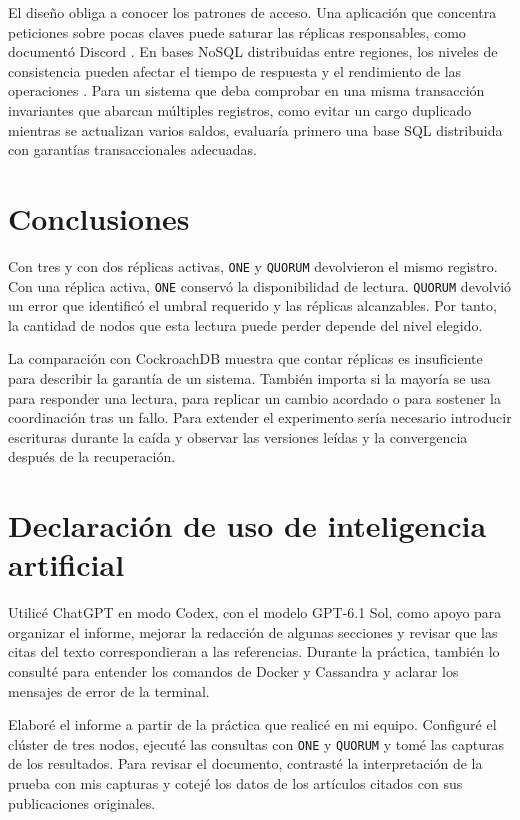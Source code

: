 \documentclass[12pt,a4paper]{article}
\begin{document}
El diseño obliga a conocer los patrones de acceso. Una aplicación que concentra peticiones sobre pocas claves puede saturar las réplicas responsables, como documentó Discord \cite{discord2023}. En bases NoSQL distribuidas entre regiones, los niveles de consistencia pueden afectar el tiempo de respuesta y el rendimiento de las operaciones \cite{ferreira2024,ferreira_benchmarking_2025}. Para un sistema que deba comprobar en una misma transacción invariantes que abarcan múltiples registros, como evitar un cargo duplicado mientras se actualizan varios saldos, evaluaría primero una base SQL distribuida con garantías transaccionales adecuadas.

\section{Conclusiones}Con tres y con dos réplicas activas, \texttt{ONE} y \texttt{QUORUM} devolvieron el mismo registro. Con una réplica activa, \texttt{ONE} conservó la disponibilidad de lectura. \texttt{QUORUM} devolvió un error que identificó el umbral requerido y las réplicas alcanzables. Por tanto, la cantidad de nodos que esta lectura puede perder depende del nivel elegido.

La comparación con CockroachDB muestra que contar réplicas es insuficiente para describir la garantía de un sistema. También importa si la mayoría se usa para responder una lectura, para replicar un cambio acordado o para sostener la coordinación tras un fallo. Para extender el experimento sería necesario introducir escrituras durante la caída y observar las versiones leídas y la convergencia después de la recuperación.

\section{Declaración de uso de inteligencia artificial}Utilicé ChatGPT en modo Codex, con el modelo GPT-6.1 Sol, como apoyo para organizar el informe, mejorar la redacción de algunas secciones y revisar que las citas del texto correspondieran a las referencias. Durante la práctica, también lo consulté para entender los comandos de Docker y Cassandra y aclarar los mensajes de error de la terminal.

Elaboré el informe a partir de la práctica que realicé en mi equipo. Configuré el clúster de tres nodos, ejecuté las consultas con \texttt{ONE} y \texttt{QUORUM} y tomé las capturas de los resultados. Para revisar el documento, contrasté la interpretación de la prueba con mis capturas y cotejé los datos de los artículos citados con sus publicaciones originales.
\end{document}
